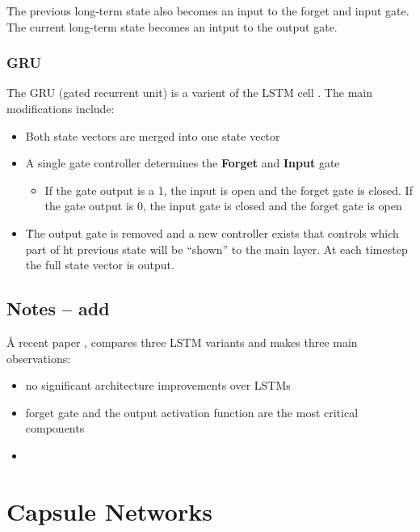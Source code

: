 \r{The previous long-term state also becomes an input to the forget and input gate. The current long-term state becomes an intput to the output gate.}



\subsubsection{GRU}

\r{The GRU (gated recurrent unit) is a varient of the LSTM cell . The main modifications include:}

\begin{itemize}[noitemsep,topsep=0pt]
	\item Both state vectors are merged into one state vector
	\item A single gate controller determines the \textbf{Forget} and \textbf{Input} gate
	\begin{itemize}[noitemsep,topsep=0pt]
		\item If the gate output is a 1, the input is open and the forget gate is closed. If the gate output is 0, the input gate is closed and the forget gate is open
	\end{itemize}
	\item \r{The output gate is removed and a new controller exists that controls which part of ht previous state will be ``shown'' to the main layer}. At each timestep the full state vector is output.
\end{itemize}

\subsection{Notes -- add}

\r{A recent paper , compares three LSTM variants and makes three main observations:}

\begin{itemize}[noitemsep,topsep=0pt]
	\item no significant architecture improvements over LSTMs
	\item forget gate and the output activation function are the most critical components
	\item {}
\end{itemize}




\section{Capsule Networks}

